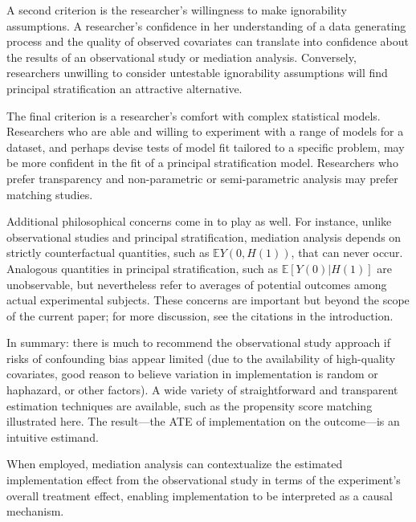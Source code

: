 \documentclass{article}\usepackage[]{graphicx}\usepackage[]{color}
\newcommand{\EE}{\mathbb{E}}
\begin{document}
A second criterion is the researcher's willingness to make
ignorability assumptions.
A researcher's confidence in her understanding of a data generating
process and the quality of observed covariates can translate into
confidence about the results of an observational study or mediation
analysis.
Conversely, researchers unwilling to consider untestable ignorability
assumptions will find principal stratification an attractive alternative.

The final criterion is a researcher's comfort with complex statistical
models.
Researchers who are able and willing to experiment with a range of
models for a dataset, and perhaps devise tests of model fit tailored
to a specific problem, may be more confident in the fit of a principal stratification model.
Researchers who prefer transparency and non-parametric or
semi-parametric analysis may prefer matching studies.

Additional philosophical concerns come in to play as well.
For instance, unlike observational studies and principal stratification, mediation analysis
depends on strictly counterfactual quantities, such as $\EE Y(0,H(1))$,
that can never occur.
Analogous quantities in principal stratification, such as $\EE [Y(0)|H(1)]$ are
unobservable, but nevertheless refer to averages of potential outcomes
among actual experimental subjects.
These concerns are important but beyond the scope of the current
paper; for more discussion, see the citations in the introduction.

In summary: there is much to recommend the observational study approach
if risks of confounding bias appear limited
(due to the availability of high-quality covariates, good reason to
believe variation in implementation is random or haphazard, or other
factors).
A wide variety of straightforward and transparent estimation techniques
are available, such as the propensity score
matching illustrated here.
The result---the ATE of implementation on the outcome---is an
intuitive estimand.

When employed, mediation analysis can contextualize the estimated
implementation effect from the observational study in terms of the
experiment's overall treatment
effect, enabling implementation to be interpreted as a causal
mechanism.
\end{document}
